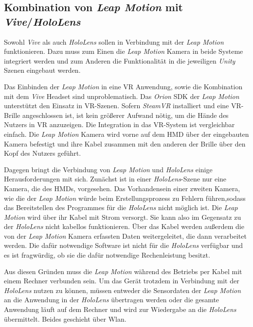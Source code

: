 \subsection{Kombination von \textit{Leap Motion} mit \textit{Vive}/\textit{HoloLens}}
\label{kombination}

Sowohl \textit{Vive} als auch \textit{HoloLens} sollen in Verbindung mit der \textit{Leap Motion} funktionieren. Dazu muss zum Einen die \textit{Leap Motion} Kamera in beide Systeme integriert werden und zum Anderen die Funktionalität in die jeweiligen \textit{Unity} Szenen eingebaut werden. 

Das Einbinden der \textit{Leap Motion} in eine VR Anwendung, sowie die Kombination mit dem \textit{Vive} Headset sind unproblematisch. Das \textit{Orion} SDK der \textit{Leap Motion} unterstützt den Einsatz in VR-Szenen. Sofern \textit{SteamVR} installiert und eine VR-Brille angeschlossen ist, ist kein größerer Aufwand nötig, um die Hände des Nutzers in VR anzuzeigen. 
Die Integration in das VR-System ist vergleichbar einfach. Die \textit{Leap Motion} Kamera wird vorne auf dem HMD über der eingebauten Kamera befestigt und ihre Kabel zusammen mit den anderen der Brille über den Kopf des Nutzers geführt. 

Dagegen bringt die Verbindung von \textit{Leap Motion} und \textit{HoloLens} einige Herausforderungen mit sich. Zunächst ist in einer \textit{HoloLens}-Szene nur eine Kamera, die des HMDs, vorgesehen. Das Vorhandensein einer zweiten Kamera, wie die der \textit{Leap Motion} würde beim Erstellungsprozess zu Fehlern führen,sodass das Bereitstellen des Programmes für die \textit{HoloLens} nicht möglich ist.
Die \textit{Leap Motion} wird über ihr Kabel mit Strom versorgt. Sie kann also im Gegensatz zu der \textit{HoloLens} nicht kabellos funktionieren. 
Über das Kabel werden außerdem die von der \textit{Leap Motion} Kamera erfassten Daten weitergeleitet, die dann verarbeitet werden. Die dafür notwendige Software ist nicht für die \textit{HoloLens} verfügbar und es ist fragwürdig, ob sie die dafür notwendige Rechenleistung besitzt. 

Aus diesen Gründen muss die \textit{Leap Motion} während des Betriebs per Kabel mit einem Rechner verbunden sein. Um das Gerät trotzdem in Verbindung mit der \textit{HoloLens} nutzen zu können, müssen entweder die Sensordaten der \textit{Leap Motion} an die Anwendung in der \textit{HoloLens} übertragen werden oder die gesamte Anwendung läuft auf dem Rechner und wird zur Wiedergabe an die \textit{HoloLens} übermittelt. Beides geschieht über Wlan.

